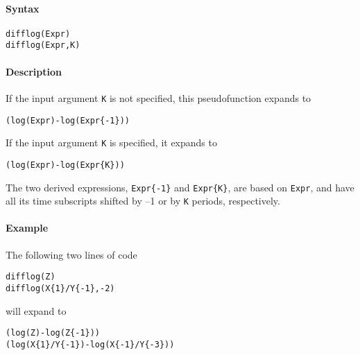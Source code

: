 


	\paragraph{Syntax}

\begin{verbatim}
difflog(Expr)
difflog(Expr,K)
\end{verbatim}

\paragraph{Description}

If the input argument \texttt{K} is not specified, this pseudofunction
expands to

\begin{verbatim}
(log(Expr)-log(Expr{-1}))
\end{verbatim}

If the input argument \texttt{K} is specified, it expands to

\begin{verbatim}
(log(Expr)-log(Expr{K}))
\end{verbatim}

The two derived expressions, \texttt{Expr\{-1\}} and \texttt{Expr\{K\}},
are based on \texttt{Expr}, and have all its time subscripts shifted by
--1 or by \texttt{K} periods, respectively.

\paragraph{Example}

The following two lines of code

\begin{verbatim}
difflog(Z)
difflog(X{1}/Y{-1},-2)
\end{verbatim}

will expand to

\begin{verbatim}
(log(Z)-log(Z{-1}))
(log(X{1}/Y{-1})-log(X{-1}/Y{-3}))
\end{verbatim}



